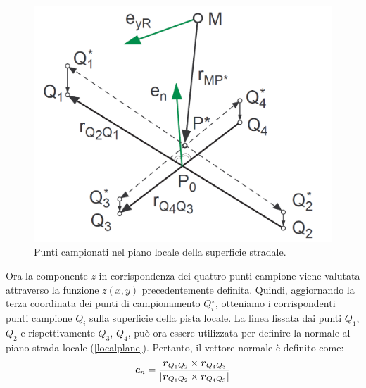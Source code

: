 \begin{figure}[h]
	\centering
	\includegraphics[width=0.5\linewidth]{Figures/local_track}
	\caption{Punti campionati nel piano locale della superficie stradale.}
	\label{localtrack}
\end{figure}
%
\noindent
Ora la componente $z$ in corrispondenza dei quattro punti campione viene valutata attraverso la funzione $z(x,y)$ precedentemente definita. Quindi, aggiornando la terza coordinata dei punti di campionamento $Q^\star_i$, otteniamo i corrispondenti punti campione $Q_i$ sulla superficie della pista locale. La linea fissata dai punti $Q_1$, $Q_2$ e rispettivamente $Q_3$, $Q_4$, può ora essere utilizzata per definire la normale al piano strada locale (\figurename \ref{localplane}). Pertanto, il vettore normale è definito come:
%
\begin{equation}
\textbf{\textit{e}}_n = \frac{\textbf{\textit{r}}_{Q_1 Q_2} \times \textbf{\textit{r}}_{Q_4 Q_3}}{|\textbf{\textit{r}}_{Q_1 Q_2} \times \textbf{\textit{r}}_{Q_4 Q_3}|}
\end{equation}

